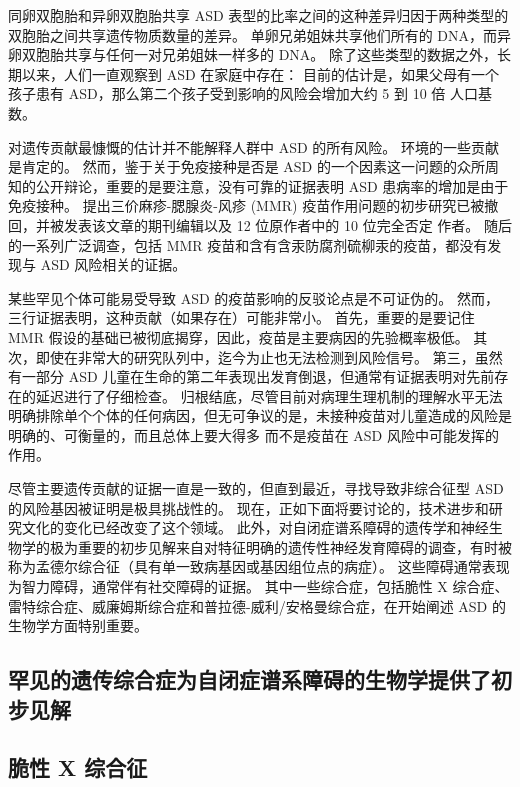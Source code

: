 同卵双胞胎和异卵双胞胎共享 ASD 表型的比率之间的这种差异归因于两种类型的双胞胎之间共享遗传物质数量的差异。
单卵兄弟姐妹共享他们所有的 DNA，而异卵双胞胎共享与任何一对兄弟姐妹一样多的 DNA。
除了这些类型的数据之外，长期以来，人们一直观察到 ASD 在家庭中存在：
目前的估计是，如果父母有一个孩子患有 ASD，那么第二个孩子受到影响的风险会增加大约 5 到 10 倍 人口基数。


对遗传贡献最慷慨的估计并不能解释人群中 ASD 的所有风险。
环境的一些贡献是肯定的。
然而，鉴于关于免疫接种是否是 ASD 的一个因素这一问题的众所周知的公开辩论，重要的是要注意，没有可靠的证据表明 ASD 患病率的增加是由于免疫接种。
提出三价麻疹-腮腺炎-风疹 (MMR) 疫苗作用问题的初步研究已被撤回，并被发表该文章的期刊编辑以及 12 位原作者中的 10 位完全否定 作者。
随后的一系列广泛调查，包括 MMR 疫苗和含有含汞防腐剂硫柳汞的疫苗，都没有发现与 ASD 风险相关的证据。


某些罕见个体可能易受导致 ASD 的疫苗影响的反驳论点是不可证伪的。
然而，三行证据表明，这种贡献（如果存在）可能非常小。
首先，重要的是要记住 MMR 假设的基础已被彻底揭穿，因此，疫苗是主要病因的先验概率极低。
其次，即使在非常大的研究队列中，迄今为止也无法检测到风险信号。
第三，虽然有一部分 ASD 儿童在生命的第二年表现出发育倒退，但通常有证据表明对先前存在的延迟进行了仔细检查。
归根结底，尽管目前对病理生理机制的理解水平无法明确排除单个个体的任何病因，但无可争议的是，未接种疫苗对儿童造成的风险是明确的、可衡量的，而且总体上要大得多 而不是疫苗在 ASD 风险中可能发挥的作用。


尽管主要遗传贡献的证据一直是一致的，但直到最近，寻找导致非综合征型 ASD 的风险基因被证明是极具挑战性的。
现在，正如下面将要讨论的，技术进步和研究文化的变化已经改变了这个领域。
此外，对自闭症谱系障碍的遗传学和神经生物学的极为重要的初步见解来自对特征明确的遗传性神经发育障碍的调查，有时被称为孟德尔综合征（具有单一致病基因或基因组位点的病症）。
这些障碍通常表现为智力障碍，通常伴有社交障碍的证据。
其中一些综合症，包括脆性 X 综合症、雷特综合症、威廉姆斯综合症和普拉德-威利/安格曼综合症，在开始阐述 ASD 的生物学方面特别重要。



\subsection{罕见的遗传综合症为自闭症谱系障碍的生物学提供了初步见解}

\subsection{脆性 X 综合征}

